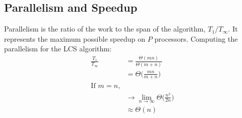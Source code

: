 \documentclass[usletter, 11pt]{extarticle}
\begin{document}
        \subsection{Parallelism and Speedup} Parallelism is the ratio of the
        work to the span of the algorithm, $T_1/T_\infty$. It represents the
        maximum possible speedup on $P$ processors. Computing the parallelism
        for the LCS algorithm:
        \begin{equation*}
            \begin{split}
                \frac{T_1}{T_\infty} & = \frac{\Theta(mn)}{\Theta(m+n)} \\
                & = \Theta\Bigg(\frac{mn}{m+n}\Bigg) \\
                \text{If $m = n$,} & \\
                & \rightarrow \lim_{n\to\infty}
                \Theta\Bigg(\frac{n^2}{2n}\Bigg) \\
                & \approx \Theta(n) \\
            \end{split}
        \end{equation*}
\end{document}

